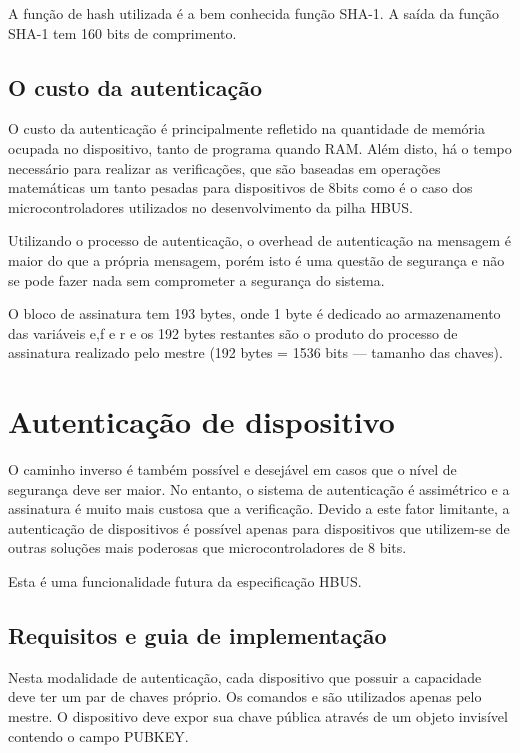 \documentclass[11pt]{report}
\begin{document}
A função de hash utilizada é a bem conhecida função SHA-1. A saída da função SHA-1 tem 160 bits de comprimento.

\subsection{O custo da autenticação}

O custo da autenticação é principalmente refletido na quantidade de memória ocupada no dispositivo, tanto de programa quando RAM. Além disto, há o tempo necessário para realizar as verificações, que são baseadas em operações matemáticas um tanto pesadas para dispositivos de 8bits como é o caso dos microcontroladores utilizados no desenvolvimento da pilha HBUS.

Utilizando o processo de autenticação, o overhead de autenticação na mensagem é maior do que a própria mensagem, porém isto é uma questão de segurança e não se pode fazer nada sem comprometer a segurança do sistema.

O bloco de assinatura tem 193 bytes, onde 1 byte é dedicado ao armazenamento das variáveis e,f e r e os 192 bytes restantes são o produto do processo de assinatura realizado pelo mestre (192 bytes = 1536 bits --- tamanho das chaves). 

\section{Autenticação de dispositivo}

O caminho inverso é também possível e desejável em casos que o nível de segurança deve ser maior. No entanto, o sistema de autenticação é assimétrico e a assinatura é muito mais custosa que a verificação. Devido a este fator limitante, a autenticação de dispositivos é possível apenas para dispositivos que utilizem-se de outras soluções mais poderosas que microcontroladores de 8 bits.

Esta é uma funcionalidade futura da especificação HBUS.

\subsection{Requisitos e guia de implementação}

Nesta modalidade de autenticação, cada dispositivo que possuir a capacidade deve ter um par de chaves próprio. Os comandos  e  são utilizados apenas pelo mestre. O dispositivo deve expor sua chave pública através de um objeto invisível contendo o campo PUBKEY.
\end{document}
